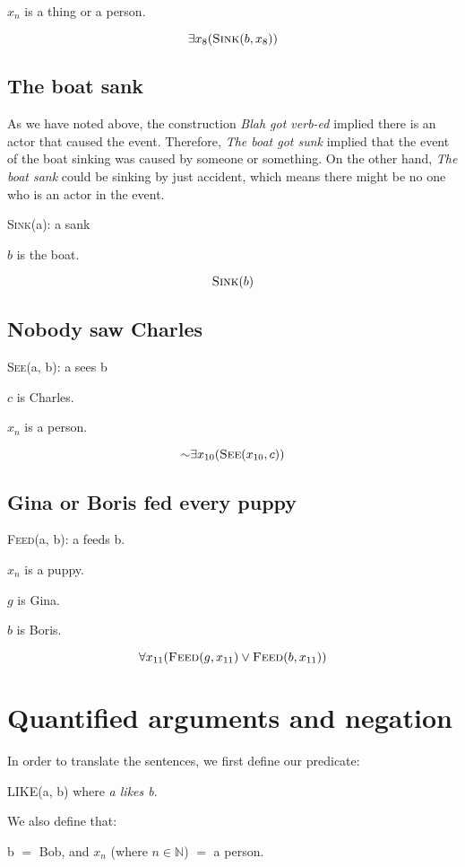 \documentclass{article}
\begin{document}
$x_n$ is a thing or a person. 

$$\exists x_8 (\textsc{Sink}(b, x_8))$$


\subsection{The boat sank}
As we have noted above, the construction \textit{Blah got verb-ed} implied there is an actor that caused the event. Therefore, \textit{The boat got sunk} implied that the event of the boat sinking was caused by someone or something. On the other hand, \textit{The boat sank} could be sinking by just accident, which means there might be no one who is an actor in the event.

\textsc{Sink}(a): a sank

$b$ is the boat.

$$\textsc{Sink}(b)$$

\subsection{Nobody saw Charles}
\textsc{See}(a, b): a sees b

$c$ is Charles.

$x_n$ is a person.

$$ \mathord{\sim} \exists x_{10} (\textsc{See}(x_{10}, c))$$


\subsection{Gina or Boris fed every puppy}

\textsc{Feed}(a, b): a feeds b.

$x_n$ is a puppy.

$g$ is Gina.

$b$ is Boris.

$$\forall x_{11} (\textsc{Feed}(g, x_{11}) \lor \textsc{Feed}(b, x_{11}))$$



\section{Quantified arguments and negation}
In order to translate the sentences, we first define our predicate: 

\hspace*{1cm} \textsc{LIKE}(a, b) where \textit{a likes b}. 

We also define that:

\hspace*{1cm} b $=$ Bob, and $x_n$ (where $n \in \mathbb{N}$) $=$ a person. 
\end{document}
